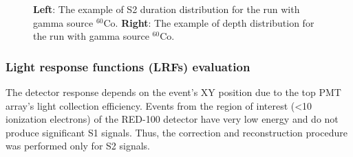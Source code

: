 \documentclass[a4paper,11pt]{article}
\begin{document}
\begin{figure}[htbp]
  \begin{minipage}[ht]{0.49\linewidth}    
  \end{minipage}
  \hfill
  \begin{minipage}[ht]{0.49\linewidth}  
  \end{minipage}
	\caption{\textbf{Left}: The example of S2 duration distribution for the run with gamma source $^{60}$Co. \textbf{Right}: The example of depth distribution for the run with gamma source $^{60}$Co.}
	\label{img:depthdur}
\end{figure}

\subsubsection{Light response functions (LRFs) evaluation}
\label{subsubsec:lrfrec2}
The detector response depends on the event's XY position due to the top PMT array's light collection efficiency.
Events from the region of interest (<10 ionization electrons) of the RED-100 detector have very low energy and do not produce significant S1 signals.
Thus, the correction and reconstruction procedure was performed only for S2 signals.
\end{document}
